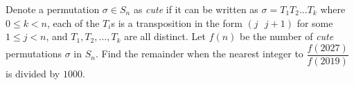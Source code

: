 Denote a permutation $\sigma \in S_n$ as \emph{cute} if it can be written as $\sigma = T_1 T_2 ... T_k$ where $0 \leq k < n$, each of the $T_i$s is a  transposition in the form $(j \text{    }j+1)$ for some $1 \leq j < n$, and $T_1, T_2, ..., T_k$ are all distinct. Let $f(n)$ be the number of \emph{cute} permutations $\sigma$ in $S_n.$ Find the remainder when the nearest integer to $\dfrac{f(2027)}{f(2019)}$ is divided by $1000.$
